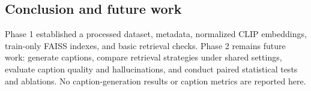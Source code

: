 \subsection{Conclusion and future work}
\label{sec:phase2}

Phase 1 established a processed dataset, metadata, normalized CLIP embeddings, train-only FAISS indexes, and basic retrieval checks. Phase 2 remains future work: generate captions, compare retrieval strategies under shared settings, evaluate caption quality and hallucinations, and conduct paired statistical tests and ablations. No caption-generation results or caption metrics are reported here.
